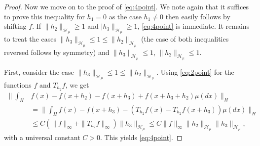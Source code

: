 \documentclass[11pt,a4paper]{article}
\renewcommand{\H}{\mathcal{H}}
\renewcommand{\ge}{\geqslant}
\renewcommand{\le}{\leqslant}
\newcommand{\CM}{\H_\mu}
\numberwithin{equation}{section}
\theoremstyle{definition}
\theoremstyle{remark}
\theoremstyle{plain}
\begin{document}
\begin{proof}
Now we move on to the proof of  \eqref{eq:4point}. We note again that it suffices to prove this inequality  for $h_1=0$ as the case $h_1\neq 0$ then easily follows by shifting $f$. If $\|h_2\|_{\CM}\ge1$ and $|h_3\|_{\CM}\ge 1$, \eqref{eq:4point} is immediate.
It remains to treat the cases $\|h_3\|_{\CM}\leqslant 1 \leqslant \|h_2\|_{\CM}$ (the case of both inequalities reversed follows by symmetry) and $\|h_3\|_{\CM}\le 1$, $\|h_2\|_{\CM} \leqslant 1$.

First, consider the case $\|h_3\|_{\CM}\leqslant 1 \leqslant \|h_2\|_{\CM}$.
Using \eqref{eq:2point} for the functions $f$ and $T_{h_2}f$, we get
\begin{align*}
    \Big\|\int_H &f(x)-f(x+h_2)-f(x+h_3)+f(x+h_3+h_2) \mu(dx)\Big\|_{H} \\ &=\Big\|\int_H f(x)-f(x+h_3)-(T_{h_2}f(x)-T_{h_2}f(x+h_3)) \mu(dx) \Big\|_{H}\\
    &\leqslant C(\|f\|_\infty + \|T_{h_2}f\|_\infty)\|h_3\|_{\CM}\le C \|f\|_\infty \|h_2\|_{\CM}\|h_3\|_{\CM},
\end{align*}
with a universal constant $C>0$. This yields \eqref{eq:4point}.


\end{proof}
\end{document}
